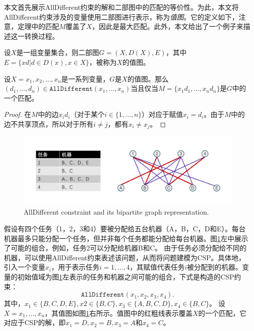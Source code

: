 本文首先展示AllDifferent约束的解和二部图中的匹配的等价性。为此，本文将AllDifferent约束涉及的变量使用二部图进行表示，称为\textit{值图}。它的定义如下，注意，定理中的匹配$M$覆盖了$X$，因此是最大匹配。此外，本文给出了一个例子来描述这一转换过程。
\begin{definition}[\textbf{值图}]
设$X$是一组变量集合，则二部图$G = (X, D(X), E)$，其中$E = \{xd | d \in D(x), x \in X\}$，被称为$X$的值图。
\end{definition}

\begin{theorem}
设$X = x_1, x_2, \dots, x_n$是一系列变量，$G$是$X$的值图。那么$(d_1, \dots, d_n) \in \texttt {AllDifferent}(x_1, \dots, x_n)$当且仅当$M = \{x_1d_1, \dots, x_nd_n\}$是$G$中的一个匹配。
\end{theorem}

\begin{proof}
在$M$中的边$x_id_i$（对于某个$i \in \{1, . . . , n\}$）对应于赋值$x_i = d_i$。由于$M$中的边不共享顶点，所以对于所有$i \neq j$，都有$x_i \neq x_j$。
\end{proof}

\begin{figure}[t]
    \centering
    \includegraphics[width=\columnwidth]{Img/A&G.pdf}
     {AllDifferent constraint and its bipartite graph representation.}
    \label{fig:AandG}
\end{figure}

\begin{example}
    假设有四个任务（1，2，3和4）要被分配给五台机器（A，B，C，D和E）。每台机器最多只能分配一个任务，但并非每个任务都能分配给每台机器。图\ref{fig:AandG}左中展示了可能的组合，例如，任务2可以分配给机器B和C。
    由于任务必须分配给不同的机器，可以使用AllDifferent约束表述该问题，从而将问题建模为CSP。具体地，引入一个变量$x_i$，用于表示任务$i = 1, \dots, 4$，其赋值代表任务$i$被分配到的机器。变量的初始值域为图\ref{fig:AandG}左表示的任务和机器之间可能的组合，下式是构造的CSP约束：
    \begin{equation*}
        \texttt {AllDifferent}(x_1, x_2, x_3, x_4).
    \end{equation*}
    其中，$x_1 \in \{B, C, D, E\}, x2 \in \{B, C\}, x_3 \in \{A, B, C, D\}, x_4 \in \{B, C\}$。
    设$X = x_1, \dots, x_n$，其值图如图\ref{fig:AandG}右所示。值图中的红粗线表示覆盖$X$的一个匹配，它对应于CSP的解，即$x_1 = D, x_2 = B, x_3 = A$和$x_4 = C$。
\end{example}

